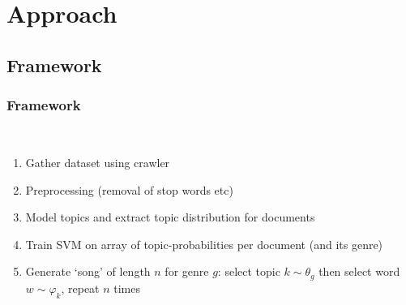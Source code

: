 \documentclass[t,ignorenonframetext]{beamer}
\begin{document}
\section[Approach]{Approach}
\subsection{Framework}

\begin{frame}
\frametitle{Framework}~\\
\begin{enumerate}
	\item Gather dataset using crawler
	\item Preprocessing (removal of stop words etc)
	\item Model topics and extract topic distribution for documents
	\item Train SVM on array of topic-probabilities per document (and its genre)
	\item Generate `song' of length $n$ for genre $g$: select topic $k \sim \theta_g$ then select word $w \sim \varphi_k$, repeat $n$ times
\end{enumerate}

\end{frame}
\end{document}

